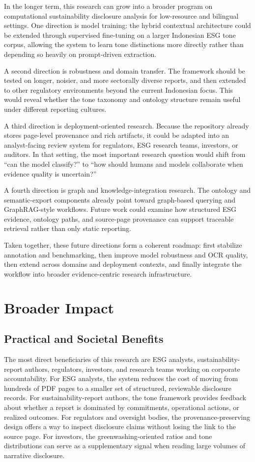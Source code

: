 \documentclass[english, online, cse, master]{dithesis}
\begin{document}
In the longer term, this research can grow into a broader program on computational sustainability disclosure analysis for low-resource and bilingual settings. One direction is model training: the hybrid contextual architecture could be extended through supervised fine-tuning on a larger Indonesian ESG tone corpus, allowing the system to learn tone distinctions more directly rather than depending so heavily on prompt-driven extraction.

A second direction is robustness and domain transfer. The framework should be tested on longer, noisier, and more sectorally diverse reports, and then extended to other regulatory environments beyond the current Indonesian focus. This would reveal whether the tone taxonomy and ontology structure remain useful under different reporting cultures.

A third direction is deployment-oriented research. Because the repository already stores page-level provenance and rich artifacts, it could be adapted into an analyst-facing review system for regulators, ESG research teams, investors, or auditors. In that setting, the most important research question would shift from “can the model classify?” to “how should humans and models collaborate when evidence quality is uncertain?”

A fourth direction is graph and knowledge-integration research. The ontology and semantic-export components already point toward graph-based querying and GraphRAG-style workflows. Future work could examine how structured ESG evidence, ontology paths, and source-page provenance can support traceable retrieval rather than only static reporting.

Taken together, these future directions form a coherent roadmap: first stabilize annotation and benchmarking, then improve model robustness and OCR quality, then extend across domains and deployment contexts, and finally integrate the workflow into broader evidence-centric research infrastructure.

\section{Broader Impact}
\subsection{Practical and Societal Benefits}

The most direct beneficiaries of this research are ESG analysts, sustainability-report authors, regulators, investors, and research teams working on corporate accountability. For ESG analysts, the system reduces the cost of moving from hundreds of PDF pages to a smaller set of structured, reviewable disclosure records. For sustainability-report authors, the tone framework provides feedback about whether a report is dominated by commitments, operational actions, or realized outcomes. For regulators and oversight bodies, the provenance-preserving design offers a way to inspect disclosure claims without losing the link to the source page. For investors, the greenwashing-oriented ratios and tone distributions can serve as a supplementary signal when reading large volumes of narrative disclosure.
\end{document}
